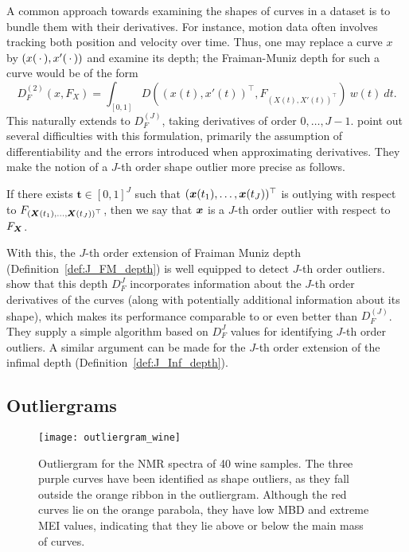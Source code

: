 A common approach towards examining the shapes of curves in a dataset is to
bundle them with their derivatives.
For instance, motion data often involves tracking both position and velocity
over time.
Thus, one may replace a curve $x$ by $(x(\,\cdot\,), x'(\,\cdot\,))$ and examine its
depth; the Fraiman-Muniz depth for such a curve would be of the form
\begin{equation}
    D_F^{(2)}(x, F_{X}) = \int_{[0, 1]} D((x(t), x'(t))^\top, F_{(X(t), X'(t))^\top}) \:w(t)\:dt.
\end{equation}
This naturally extends to $D_F^{(J)}$, taking derivatives of order $0, \dots,
J - 1$.
\textcite{nagy-gijbels-hlubinka-2017} point out several difficulties with this
formulation, primarily the assumption of differentiability and the errors
introduced when approximating derivatives.
They make the notion of a $J$-th order shape outlier more precise as follows.

\begin{definition}
    If there exists $\bm{t} \in [0, 1]^J$ such that $(\bm{x}(t_1), \dots,
    \bm{x}(t_J))^\top$ is outlying with respect to $F_{(\bm{X}(t_1), \dots,
    \bm{X}(t_J))^\top}$, then we say that $\bm{x}$ is a $J$-th order outlier with
    respect to $F_{\bm{X}}$.
\end{definition}

With this, the $J$-th order extension of Fraiman Muniz depth
(Definition~\ref{def:J_FM_depth}) is well equipped to detect $J$-th order
outliers.
\textcite{nagy-gijbels-hlubinka-2017} show that this depth $D_F^J$
incorporates information about the $J$-th order derivatives of the curves
(along with potentially additional information about its shape), which makes
its performance comparable to or even better than $D_F^{(J)}$.
They supply a simple algorithm based on $D_F^J$ values for identifying $J$-th
order outliers.
A similar argument can be made for the $J$-th order extension of the infimal
depth (Definition~\ref{def:J_Inf_depth}).


\subsection{Outliergrams}

\begin{figure}
    \centering
    \texttt{[image: outliergram\_wine]}
    \caption{
        Outliergram for the NMR spectra of 40 wine samples.
        The three purple curves have been identified as shape outliers, as
        they fall outside the orange ribbon in the outliergram.
        Although the red curves lie on the orange parabola, they have low MBD
        and extreme MEI values, indicating that they lie above or below the
        main mass of curves.
    }
    \label{fig:outliergram_wine}
\end{figure}



